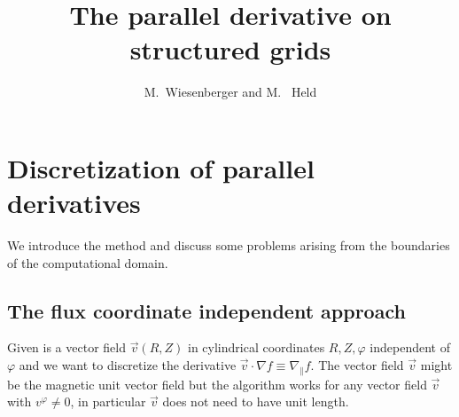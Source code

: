 


\newcommand{\RR}{{\rho}}
\newcommand{\ZZ}{{\zeta}}
\newcommand{\PP}{{\Phi}}
\newcommand{\CC}{s}




\title{The parallel derivative on structured grids}
\author{M.~Wiesenberger and M.~ Held}

\maketitle

\tableofcontents
\section{Discretization of parallel derivatives} \label{sec:parallel}
We introduce the method
and discuss some problems arising from the boundaries of the computational domain.

\subsection{The flux coordinate independent approach} \label{sec:parallela}
Given is a vector field $\vec v(R,Z)$ in cylindrical coordinates $R,Z,\varphi$ independent of $\varphi$ and we want to
discretize the derivative $\vec v \cdot\nabla f \equiv \nabla_\parallel f$.
The vector field $\vec v$ might be the magnetic unit vector field but the algorithm works
for any vector field $\vec v$ with $v^\varphi\neq 0$, in particular $\vec v$ does not need
to have unit length.

